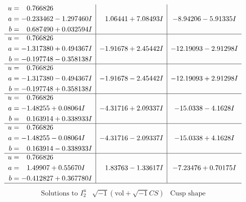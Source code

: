 \documentclass[1p]{elsarticle_modified}
\theoremstyle{definition}
\newcommand{\I}{\sqrt{-1}}
\begin{document}
$$\begin{array}{c|c|c}
\begin{aligned}
u &= \phantom{-}0.766826\phantom{ +0.000000I} \\
a &= -0.233462 - 1.297460 I \\
b &= \phantom{-}0.687490 + 0.032594 I\end{aligned}
 & \phantom{-}1.06441 + 7.08493 I & -8.94206 - 5.91335 I \\ \hline\begin{aligned}
u &= \phantom{-}0.766826\phantom{ +0.000000I} \\
a &= -1.317380 + 0.494367 I \\
b &= -0.197748 - 0.358138 I\end{aligned}
 & -1.91678 + 2.45442 I & -12.19093 - 2.91298 I \\ \hline\begin{aligned}
u &= \phantom{-}0.766826\phantom{ +0.000000I} \\
a &= -1.317380 - 0.494367 I \\
b &= -0.197748 + 0.358138 I\end{aligned}
 & -1.91678 - 2.45442 I & -12.19093 + 2.91298 I \\ \hline\begin{aligned}
u &= \phantom{-}0.766826\phantom{ +0.000000I} \\
a &= -1.48255 + 0.08064 I \\
b &= \phantom{-}0.163914 + 0.338933 I\end{aligned}
 & -4.31716 + 2.09337 I & -15.0338 - 4.1628 I \\ \hline\begin{aligned}
u &= \phantom{-}0.766826\phantom{ +0.000000I} \\
a &= -1.48255 - 0.08064 I \\
b &= \phantom{-}0.163914 - 0.338933 I\end{aligned}
 & -4.31716 - 2.09337 I & -15.0338 + 4.1628 I \\ \hline\begin{aligned}
u &= \phantom{-}0.766826\phantom{ +0.000000I} \\
a &= \phantom{-}1.49907 + 0.55670 I \\
b &= -0.412827 + 0.367780 I\end{aligned}
 & \phantom{-}1.83763 - 1.33617 I & -7.23476 + 0.70175 I\\
 \hline 
 \end{array}$$\newpage$$\begin{array}{c|c|c}  
\text{Solutions to }I^u_{2}& \I (\text{vol} + \sqrt{-1}CS) & \text{Cusp shape}\\

\end{array}$$
\end{document}
